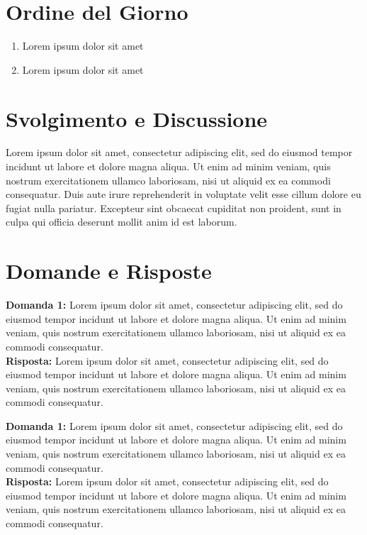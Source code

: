 \documentclass[a4paper,12pt]{article}
\begin{document}
\section{Ordine del Giorno}
\begin{enumerate}
    \item Lorem ipsum dolor sit amet
    \item Lorem ipsum dolor sit amet
\end{enumerate}
\vspace{0.5cm}
\section{Svolgimento e Discussione}
Lorem ipsum dolor sit amet, consectetur adipiscing elit, sed do eiusmod tempor incidunt ut labore et dolore magna aliqua. Ut enim ad minim veniam, quis nostrum exercitationem ullamco laboriosam, nisi ut aliquid ex ea commodi consequatur. Duis aute irure reprehenderit in voluptate velit esse cillum dolore eu fugiat nulla pariatur. Excepteur sint obcaecat cupiditat non proident, sunt in culpa qui officia deserunt mollit anim id est laborum.

\vspace{0.5cm}

\section{Domande e Risposte}

\textbf{Domanda 1:} Lorem ipsum dolor sit amet, consectetur adipiscing elit, sed do eiusmod tempor incidunt ut labore et dolore magna aliqua. Ut enim ad minim veniam, quis nostrum exercitationem ullamco laboriosam, nisi ut aliquid ex ea commodi consequatur.\\[0.5em]
\textbf{Risposta:} Lorem ipsum dolor sit amet, consectetur adipiscing elit, sed do eiusmod tempor incidunt ut labore et dolore magna aliqua. Ut enim ad minim veniam, quis nostrum exercitationem ullamco laboriosam, nisi ut aliquid ex ea commodi consequatur.

\vspace{2em}

\textbf{Domanda 1:} Lorem ipsum dolor sit amet, consectetur adipiscing elit, sed do eiusmod tempor incidunt ut labore et dolore magna aliqua. Ut enim ad minim veniam, quis nostrum exercitationem ullamco laboriosam, nisi ut aliquid ex ea commodi consequatur.\\[0.5em]
\textbf{Risposta:} Lorem ipsum dolor sit amet, consectetur adipiscing elit, sed do eiusmod tempor incidunt ut labore et dolore magna aliqua. Ut enim ad minim veniam, quis nostrum exercitationem ullamco laboriosam, nisi ut aliquid ex ea commodi consequatur.
\end{document}
